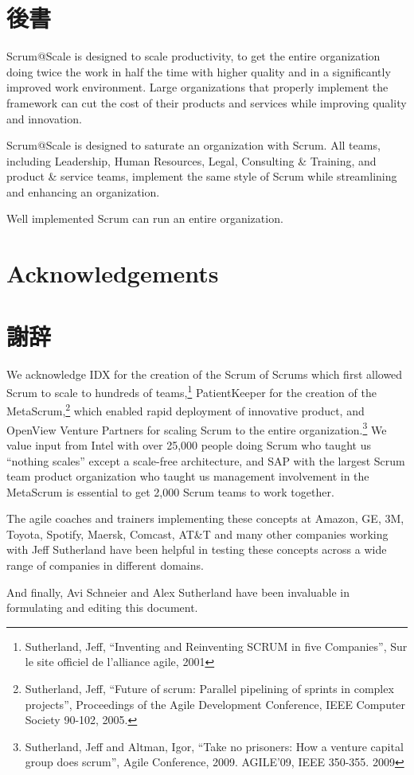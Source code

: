 \documentclass[12pt,a4paper,parskip=full]{scrartcl}
\begin{document}
\section{後書}
Scrum@Scale is designed to scale productivity, to get the entire
organization doing twice the work in half the time with higher quality and
in a significantly improved work environment. Large organizations that
properly implement the framework can cut the cost of their products and
services while improving quality and innovation.

Scrum@Scale is designed to saturate an organization with Scrum. All teams,
including Leadership, Human Resources, Legal, Consulting \& Training, and
product \& service teams, implement the same style of Scrum while
streamlining and enhancing an organization.

Well implemented Scrum can run an entire organization.

\section{Acknowledgements}
\fi
\section{謝辞}
We acknowledge IDX for the creation of the Scrum of Scrums which first
allowed Scrum to scale to hundreds of teams,\footnote{Sutherland, Jeff,
``Inventing and Reinventing SCRUM in five Companies'', Sur le site officiel
de l'alliance agile, 2001} PatientKeeper for the creation of the
MetaScrum,\footnote{Sutherland, Jeff, ``Future of scrum: Parallel pipelining
of sprints in complex projects'', Proceedings of the Agile Development
Conference,  IEEE Computer Society 90-102,  2005.} which enabled rapid
deployment of innovative product, and OpenView Venture Partners for scaling
Scrum to the entire organization.\footnote{Sutherland, Jeff and Altman,
Igor, ``Take no prisoners: How a venture capital group does scrum'', Agile
Conference, 2009. AGILE'09, IEEE 350-355.  2009} We value input from Intel
with over 25,000 people doing Scrum who taught us ``nothing scales'' except
a scale-free architecture, and SAP with the largest Scrum team product
organization who taught us management involvement in the MetaScrum is
essential to get 2,000 Scrum teams to work together.

The agile coaches and trainers implementing these concepts at Amazon, GE,
3M, Toyota, Spotify, Maersk, Comcast, AT\&T and many other companies working with Jeff Sutherland
have been helpful in testing these concepts across a wide range of
companies in different domains.

And finally, Avi Schneier and Alex Sutherland have been invaluable in
formulating and editing this document.

\pagebreak

\printbibliography
\end{document}
